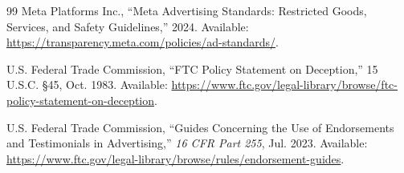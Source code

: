 \documentclass[12pt,a4paper]{report}
\begin{document}
\begin{thebibliography}{99}
Meta Platforms Inc.,
``Meta Advertising Standards: Restricted Goods, Services, and Safety Guidelines,''
2024. Available: \url{https://transparency.meta.com/policies/ad-standards/}.

U.S. Federal Trade Commission,
``FTC Policy Statement on Deception,''
15 U.S.C. \S  45, Oct. 1983. Available: \url{https://www.ftc.gov/legal-library/browse/ftc-policy-statement-on-deception}.

U.S. Federal Trade Commission,
``Guides Concerning the Use of Endorsements and Testimonials in Advertising,''
\emph{16 CFR Part 255}, Jul. 2023. Available: \url{https://www.ftc.gov/legal-library/browse/rules/endorsement-guides}.

\end{thebibliography}
\end{document}
